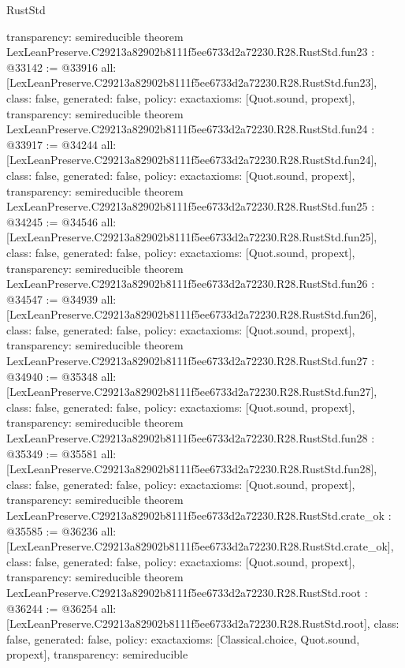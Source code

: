 \begin{lexlean}{RustStd}
\begin{coremodule}
{  transparency: semireducible
}
theorem LexLeanPreserve.C29213a82902b8111f5ee6733d2a72230.R28.RustStd.fun23 : @33142 := @33916 {
  all: [LexLeanPreserve.C29213a82902b8111f5ee6733d2a72230.R28.RustStd.fun23],
  class: false,
  generated: false,
  policy: exact{axioms: [Quot.sound, propext]},
  transparency: semireducible
}
theorem LexLeanPreserve.C29213a82902b8111f5ee6733d2a72230.R28.RustStd.fun24 : @33917 := @34244 {
  all: [LexLeanPreserve.C29213a82902b8111f5ee6733d2a72230.R28.RustStd.fun24],
  class: false,
  generated: false,
  policy: exact{axioms: [Quot.sound, propext]},
  transparency: semireducible
}
theorem LexLeanPreserve.C29213a82902b8111f5ee6733d2a72230.R28.RustStd.fun25 : @34245 := @34546 {
  all: [LexLeanPreserve.C29213a82902b8111f5ee6733d2a72230.R28.RustStd.fun25],
  class: false,
  generated: false,
  policy: exact{axioms: [Quot.sound, propext]},
  transparency: semireducible
}
theorem LexLeanPreserve.C29213a82902b8111f5ee6733d2a72230.R28.RustStd.fun26 : @34547 := @34939 {
  all: [LexLeanPreserve.C29213a82902b8111f5ee6733d2a72230.R28.RustStd.fun26],
  class: false,
  generated: false,
  policy: exact{axioms: [Quot.sound, propext]},
  transparency: semireducible
}
theorem LexLeanPreserve.C29213a82902b8111f5ee6733d2a72230.R28.RustStd.fun27 : @34940 := @35348 {
  all: [LexLeanPreserve.C29213a82902b8111f5ee6733d2a72230.R28.RustStd.fun27],
  class: false,
  generated: false,
  policy: exact{axioms: [Quot.sound, propext]},
  transparency: semireducible
}
theorem LexLeanPreserve.C29213a82902b8111f5ee6733d2a72230.R28.RustStd.fun28 : @35349 := @35581 {
  all: [LexLeanPreserve.C29213a82902b8111f5ee6733d2a72230.R28.RustStd.fun28],
  class: false,
  generated: false,
  policy: exact{axioms: [Quot.sound, propext]},
  transparency: semireducible
}
theorem LexLeanPreserve.C29213a82902b8111f5ee6733d2a72230.R28.RustStd.crate_ok : @35585 := @36236 {
  all: [LexLeanPreserve.C29213a82902b8111f5ee6733d2a72230.R28.RustStd.crate_ok],
  class: false,
  generated: false,
  policy: exact{axioms: [Quot.sound, propext]},
  transparency: semireducible
}
theorem LexLeanPreserve.C29213a82902b8111f5ee6733d2a72230.R28.RustStd.root : @36244 := @36254 {
  all: [LexLeanPreserve.C29213a82902b8111f5ee6733d2a72230.R28.RustStd.root],
  class: false,
  generated: false,
  policy: exact{axioms: [Classical.choice, Quot.sound, propext]},
  transparency: semireducible
}


\end{coremodule}
\end{lexlean}
